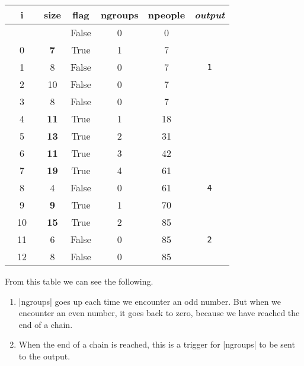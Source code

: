 \begin{inlinetable}
  \begin{tabular}{S[table-format=2.0] S[table-format=2.0] c S[table-format=3.0]
                  S[table-format=3.0] c}
    \toprule
    {~~i~~} & {size}       & {f{}lag} & {ngroups} & {npeople} & {\emph{output}} \\
    \midrule                          
            &              & False    & 0         & 0         &                 \\
    0       & \bfseries 7  & True     & 1         & 7         &                 \\
    1       & 8            & False    & 0         & 7         & \texttt{1}      \\
    2       & 10           & False    & 0         & 7         &                 \\
    3       & 8            & False    & 0         & 7         &                 \\
    4       & \bfseries 11 & True     & 1         & 18        &                 \\
    5       & \bfseries 13 & True     & 2         & 31        &                 \\
    6       & \bfseries 11 & True     & 3         & 42        &                 \\
    7       & \bfseries 19 & True     & 4         & 61        &                 \\
    8       & 4            & False    & 0         & 61        & \texttt{4}      \\
    9       & \bfseries 9  & True     & 1         & 70        &                 \\
    10      & \bfseries 15 & True     & 2         & 85        &                 \\
    11      & 6            & False    & 0         & 85        & \texttt{2}      \\
    12      & 8            & False    & 0         & 85        &                 \\
    \bottomrule
  \end{tabular}
\end{inlinetable}

From this table we can see the following.
\begin{enumerate}
  \item \pycode|ngroups| goes up each time we encounter an odd number. But when we
    encounter an even number, it goes back to zero, because we have reached the end of a
    chain.
  \item When the end of a chain is reached, this is a trigger for \pycode|ngroups| to be
    sent to the output.
\end{enumerate}

